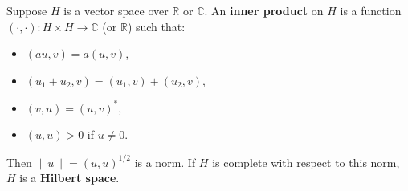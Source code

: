 Suppose $H$ is a vector space over $\mathbb{R}$ or $\mathbb{C}$. An \textbf{inner product} on $H$ is a function $( \cdot, \cdot ): H \times H \to \mathbb{C}$ (or $\mathbb{R}$) such that:
\begin{itemize}
\item $(au, v) = a(u,v)$,
\item $(u_1+u_2, v) = (u_1,v) + (u_2,v)$,
\item $(v, u) = (u,v)^*$,
\item $(u,u) > 0$ if $u \neq 0$.
\end{itemize}
Then $\|u\| = (u,u)^{1/2}$ is a norm. If $H$ is complete with respect to this norm, $H$ is a \textbf{Hilbert space}.

